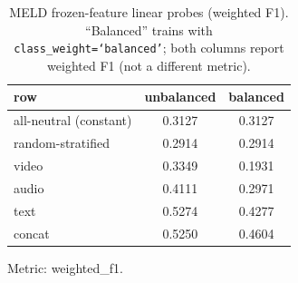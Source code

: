 \begin{table}[t]
\centering
\caption{MELD frozen-feature linear probes (weighted F1). ``Balanced'' trains with \texttt{class\_weight=`balanced'}; both columns report weighted F1 (not a different metric).}
\label{tab:meld-probe}
\begin{tabular}{lcc}
\toprule
row & unbalanced & balanced \\
\midrule
all-neutral (constant) & 0.3127 & 0.3127 \\
random-stratified & 0.2914 & 0.2914 \\
video & 0.3349 & 0.1931 \\
audio & 0.4111 & 0.2971 \\
text & 0.5274 & 0.4277 \\
concat & 0.5250 & 0.4604 \\
\bottomrule
\end{tabular}
\par\footnotesize Metric: weighted\_f1.
\end{table}
